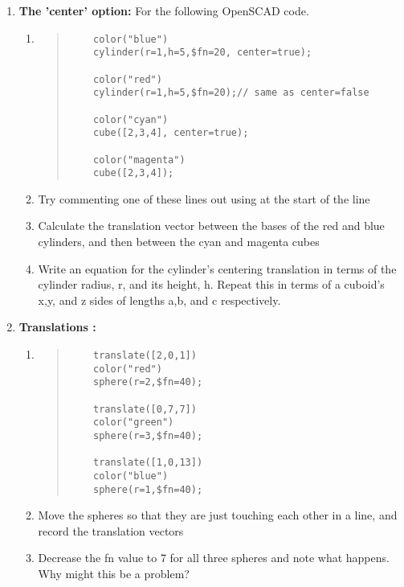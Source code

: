 \begin{enumerate}
 \item \textbf{The 'center' option: } For the following OpenSCAD code.
 \begin{enumerate}
 \item[ ]
 \begin{quote}
  \begin{verbatim}
    color("blue") 
    cylinder(r=1,h=5,$fn=20, center=true);  
    
    color("red") 
    cylinder(r=1,h=5,$fn=20);// same as center=false
    
    color("cyan") 
    cube([2,3,4], center=true);
    
    color("magenta") 
    cube([2,3,4]);
  \end{verbatim}
 \end{quote}
  \item Try commenting one of these lines out using \/\/ at the start of the line 
  \item Calculate the translation vector between the bases of the red and blue cylinders, and then between the cyan and magenta cubes 
  \item Write an equation for the cylinder's centering translation in terms of the cylinder radius, r, and its height, h. Repeat this in terms of a cuboid's x,y, and z sides of lengths a,b, and c respectively. 
 \end{enumerate}

 \item \textbf{Translations :}
 \begin{enumerate}
 \item[ ]
 \begin{quote}
  \begin{verbatim}
    translate([2,0,1]) 
    color("red") 
    sphere(r=2,$fn=40);
    
    translate([0,7,7]) 
    color("green") 
    sphere(r=3,$fn=40);
    
    translate([1,0,13]) 
    color("blue") 
    sphere(r=1,$fn=40);
  \end{verbatim}
 \end{quote}
 \item Move the spheres so that they are just touching each other in a line, and record the translation vectors 
 \item Decrease the fn value to 7 for all three spheres and note what happens. Why might this be a problem? 
 \end{enumerate}
 

\end{enumerate}
